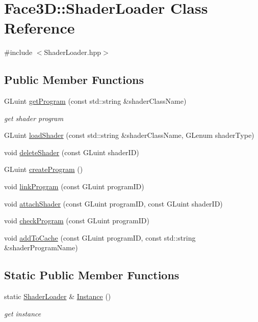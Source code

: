 \hypertarget{class_face3_d_1_1_shader_loader}{}\section{Face3D\+:\+:Shader\+Loader Class Reference}
\label{class_face3_d_1_1_shader_loader}


{\ttfamily \#include $<$Shader\+Loader.\+hpp$>$}

\subsection*{Public Member Functions}
\begin{DoxyCompactItemize}
\item 
G\+Luint \hyperlink{class_face3_d_1_1_shader_loader_a4091dd965bb5ea248179037bf5ff78de}{get\+Program} (const std\+::string \&shader\+Class\+Name)
\begin{DoxyCompactList}\small\item\em get shader program \end{DoxyCompactList}\item 
G\+Luint \hyperlink{class_face3_d_1_1_shader_loader_adc8a9f009531395a7f3799282f37e4af}{load\+Shader} (const std\+::string \&shader\+Class\+Name, G\+Lenum shader\+Type)
\item 
void \hyperlink{class_face3_d_1_1_shader_loader_ac239e9bba960ea43d26af1e9c8acd891}{delete\+Shader} (const G\+Luint shader\+ID)
\item 
G\+Luint \hyperlink{class_face3_d_1_1_shader_loader_a1c86dcd82b5e7dde836854423749d281}{create\+Program} ()
\item 
void \hyperlink{class_face3_d_1_1_shader_loader_a968155ebb8821b63b391ae65479b53f4}{link\+Program} (const G\+Luint program\+ID)
\item 
void \hyperlink{class_face3_d_1_1_shader_loader_ab0b54e024b6fe4ca52e3cf2cc122fdea}{attach\+Shader} (const G\+Luint program\+ID, const G\+Luint shader\+ID)
\item 
void \hyperlink{class_face3_d_1_1_shader_loader_a01cc11dfddbe0afa70ec2ebd78c7dde2}{check\+Program} (const G\+Luint program\+ID)
\item 
void \hyperlink{class_face3_d_1_1_shader_loader_ad688d7d2ba116947d5ff286e4810c62f}{add\+To\+Cache} (const G\+Luint program\+ID, const std\+::string \&shader\+Program\+Name)
\end{DoxyCompactItemize}
\subsection*{Static Public Member Functions}
\begin{DoxyCompactItemize}
\item 
static \hyperlink{class_face3_d_1_1_shader_loader}{Shader\+Loader} \& \hyperlink{class_face3_d_1_1_shader_loader_a903512f7a8cfd41c480f088e50fb1287}{Instance} ()
\begin{DoxyCompactList}\small\item\em get instance \end{DoxyCompactList}\end{DoxyCompactItemize}
